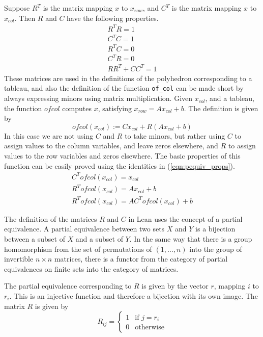 \documentclass[11pt]{article} %
\begin{document}
Suppose $R^T$ is the matrix mapping $x$ to $x_{row}$, and $C^T$ is the matrix mapping $x$ to $x_{col}$. Then $R$ and $C$ have the following properties.
\begin{equation}\label{eqn:pequiv_props}
  \begin{aligned}
    R^TR = 1 \\
    C^TC = 1 \\
    R^TC = 0 \\
    C^TR = 0 \\
    RR^T + CC^T = 1
  \end{aligned}
\end{equation}
These matrices are used in the definitions of the polyhedron corresponding to a tableau, and also the definition of the function \lstinline|of_col| can be made short by always expressing minors using matrix multiplication. Given $x_{col}$, and a tableau, the function $ofcol$ computes $x$, satisfying $x_{row} = Ax_{col} + b$. The definition is given by
\begin{equation}
  ofcol(x_{col}) := Cx_{col} + R(Ax_{col}+b)
\end{equation}
In this case we are not using $C$ and $R$ to take minors, but rather using $C$ to assign values to the column variables, and leave zeros elsewhere, and $R$ to assign values to the row variables and zeros elsewhere. The basic properties of this function can be easily proved using the identities in (\ref{eqn:pequiv_props}).
\begin{equation}
  \begin{aligned}
    C^Tofcol(x_{col}) = x_{col} \\
    R^Tofcol(x_{col}) = Ax_{col} + b \\
    R^Tofcol(x_{col}) = AC^Tofcol(x_{col}) + b
  \end{aligned}
\end{equation}


The definition of the matrices $R$ and $C$ in Lean uses the concept of a partial equivalence. A partial equivalence between two sets $X$ and $Y$ is a bijection between a subset of $X$ and a subset of $Y$. In the same way that there is a group homomorphism from the set of permutations of $(1, \dots, n)$ into the group of invertible $n \times n$ matrices, there is a functor from the category of partial equivalences on finite sets into the category of matrices.

The partial equivalence corresponding to $R$ is given by the vector $r$, mapping $i$ to $r_i$. This is an injective function and therefore a bijection with its own image. The matrix $R$ is given by
\begin{equation}
R_{ij} =
\begin{cases}
1 & \text{if } j = r_i \\
0 & \text{otherwise}
\end{cases}
\end{equation}
\end{document}
